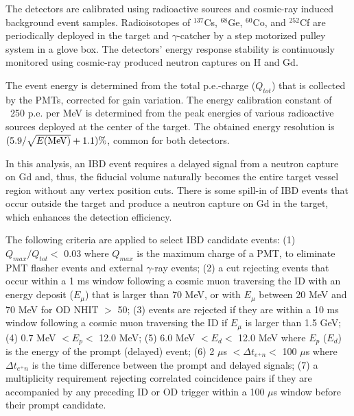 \documentclass[aps,prl,twocolumn,superscriptaddress,showpacs]{revtex4-1}
\begin{document}
The detectors are calibrated using radioactive sources and cosmic-ray induced background event samples. Radioisotopes of $^{137}$Cs, $^{68}$Ge, $^{60}$Co, and $^{252}$Cf are periodically deployed in the target and $\gamma$-catcher by a step motorized pulley system in a glove box. The detectors' energy response stability is continuously monitored using cosmic-ray produced neutron captures on H and Gd. 


The event energy is determined from the total p.e.-charge ($Q_{tot}$) that is collected by the PMTs, corrected for gain variation. The energy calibration constant of ~250 p.e. per MeV is determined from the peak energies of various radioactive sources deployed at the center of the target. The obtained energy resolution is 
$(5.9/ \sqrt{E({\rm MeV})}+1.1)\%$, common for both detectors.


In this analysis, an IBD event requires a delayed signal from a neutron capture on Gd and, thus, the fiducial volume naturally becomes the entire target vessel region without any vertex position cuts. There is some spill-in of IBD events that occur outside the target and produce a neutron capture on Gd in the target, which enhances the detection efficiency.


The following criteria are applied to select IBD candidate events: (1) $Q_{max}/Q_{tot} <$ 0.03 where $Q_{max}$ is the maximum charge of a PMT, to eliminate PMT flasher events and external $\gamma$-ray events; (2) a cut rejecting events that occur within a 1 ms window following a cosmic muon traversing the ID with an energy deposit ($E_{\mu}$) that is larger than 70 MeV, or with $E_{\mu}$ between 20 MeV and 70 MeV for OD NHIT $>$ 50; 
(3) events are rejected if they are within a 10 ms window following a cosmic muon  traversing the ID if $E_{\mu}$ is larger than 1.5 GeV; (4) 0.7 MeV $< E_p <$ 12.0 MeV; 
(5) 6.0 MeV $< E_d <$ 12.0 MeV where $E_p$ ($E_d$) is the energy of the prompt (delayed) event; (6) 2 $\mu$s $< \Delta t_{e^+ n} < $ 100 $\mu$s where $\Delta t_{e^+ n}$ is the time difference between the prompt and delayed signals; (7) a multiplicity requirement rejecting correlated coincidence pairs if they are accompanied by any preceding ID or OD trigger within a 100 $\mu$s window before their prompt candidate. 
\end{document}

